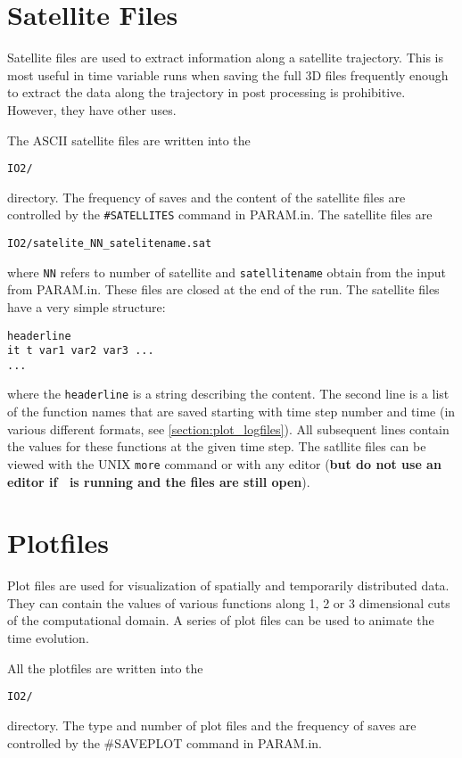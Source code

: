 \section{Satellite Files \label{section:satellitefiles}}

Satellite files  are used to extract information along a satellite
trajectory.  This is most useful in time variable runs when 
saving the full 3D files frequently enough to extract the data along
the trajectory in post processing is prohibitive.  However, they
have other uses.

The ASCII satellite files are  written into the 
\begin{verbatim}
IO2/
\end{verbatim}
directory. 
The frequency of saves and the content of the satellite files 
 are controlled by
the {\tt \#SATELLITES} command in PARAM.in. The satellite files are
\begin{verbatim}
IO2/satelite_NN_satelitename.sat
\end{verbatim}
where {\tt NN} refers to number of satellite and 
{\tt satellitename} obtain from the input from PARAM.in.
These files are closed at the end of the run.
The satellite files have a very simple structure:
\begin{verbatim}
headerline
it t var1 var2 var3 ...
...
\end{verbatim}
where the {\tt headerline} is a string describing the content.
The second line is a list of the function names that are saved
starting with time step number and time (in various different formats, see
\ref{section:plot_logfiles}). 
All subsequent lines contain the values for these functions
at the given time step. The satllite files can be viewed with the 
UNIX {\tt more} command or with any editor ({\bf but do not use an
editor if \BATSRUS\ is running and the files are  still open}). 

\section{Plotfiles \label{section:plotfiles}}

Plot files are used for visualization of spatially and temporarily 
distributed data. They can contain the values of various functions 
along 1, 2 or 3 dimensional cuts of the computational domain. 
A series of plot files can be used to animate the time evolution.

All the plotfiles are written into the
\begin{verbatim}
IO2/
\end{verbatim}
directory. 
The type and number of plot files and the frequency of saves  
are controlled by the \#SAVEPLOT command in PARAM.in.

